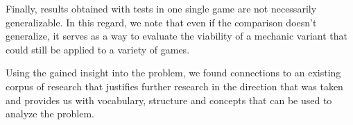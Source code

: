 Finally, results obtained with tests in one single game are not necessarily generalizable. In this regard, we note that even if the comparison doesn't generalize, it serves as a way to evaluate the viability of a mechanic variant that could still be applied to a variety of games.

Using the gained insight into the problem, we found connections to an existing corpus of research that justifies further research in the direction that was taken and provides us with vocabulary, structure and concepts that can be used to analyze the problem.